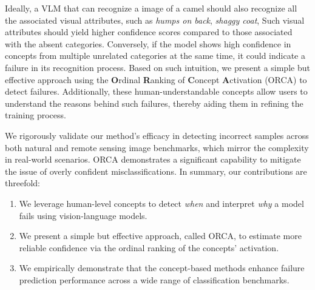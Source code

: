 Ideally, a VLM that can recognize a image of a camel should also recognize all the associated visual attributes, such as \textit{humps on back}, \textit{shaggy coat}, \etc
Such visual attributes should yield higher confidence scores compared to those associated with the absent categories.
Conversely, if the model shows high confidence in concepts from multiple unrelated categories at the same time, it could indicate a failure in its recognition process.
Based on such intuition, we present a simple but effective approach using the \textbf{O}rdinal \textbf{R}anking of \textbf{C}oncept \textbf{A}ctivation (ORCA) to detect failures.
Additionally, these human-understandable concepts allow users to understand the reasons behind such failures, thereby aiding them in refining the training process.

We rigorously validate our method's efficacy in detecting incorrect samples across both natural and remote sensing image benchmarks, which mirror the complexity in real-world scenarios. 
ORCA demonstrates a significant capability to mitigate the issue of overly confident misclassifications.
In summary, our contributions are threefold:
\begin{enumerate}
    \item We leverage human-level concepts to detect \textit{when} and interpret \textit{why} a model fails using vision-language models.
    \item We present a simple but effective approach, called ORCA, to estimate more reliable confidence via the ordinal ranking of the concepts' activation.
    \item We empirically demonstrate that the concept-based methods enhance failure prediction performance across a wide range of classification benchmarks.
\end{enumerate}